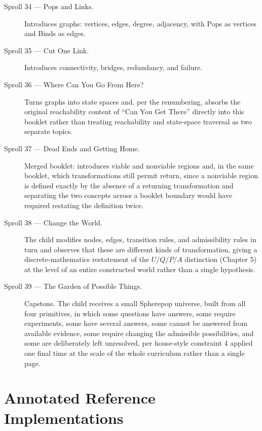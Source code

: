 \documentclass[11pt,twoside]{book}
\begin{document}
\begin{description}
\item[Sproll 34 --- Pops and Links.] Introduces graphs: vertices, edges, degree, adjacency, with Pops as vertices and Binds as edges.
\item[Sproll 35 --- Cut One Link.] Introduces connectivity, bridges, redundancy, and failure.
\item[Sproll 36 --- Where Can You Go From Here?] Turns graphs into state spaces and, per the renumbering, absorbs the original reachability content of ``Can You Get There'' directly into this booklet rather than treating reachability and state-space traversal as two separate topics.
\item[Sproll 37 --- Dead Ends and Getting Home.] Merged booklet: introduces viable and nonviable regions and, in the same booklet, which transformations still permit return, since a nonviable region is defined exactly by the absence of a returning transformation and separating the two concepts across a booklet boundary would have required restating the definition twice.
\item[Sproll 38 --- Change the World.] The child modifies nodes, edges, transition rules, and admissibility rules in turn and observes that these are different kinds of transformation, giving a discrete-mathematics restatement of the $U/Q/P/A$ distinction (Chapter 5) at the level of an entire constructed world rather than a single hypothesis.
\item[Sproll 39 --- The Garden of Possible Things.] Capstone. The child receives a small Spherepop universe, built from all four primitives, in which some questions have answers, some require experiments, some have several answers, some cannot be answered from available evidence, some require changing the admissible possibilities, and some are deliberately left unresolved, per house-style constraint 4 applied one final time at the scale of the whole curriculum rather than a single page.
\end{description}

\part{Annotated Reference Implementations}
\end{document}
